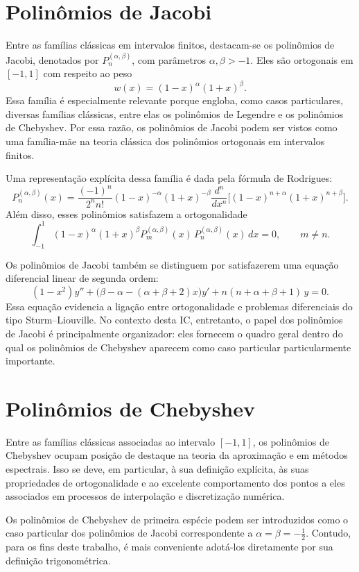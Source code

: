 \section{Polinômios de Jacobi}

Entre as famílias clássicas em intervalos finitos, destacam-se os polinômios de Jacobi, denotados por \(P_n^{(\alpha,\beta)}\), com parâmetros \(\alpha,\beta>-1\). Eles são ortogonais em \([-1,1]\) com respeito ao peso
\[
w(x)=(1-x)^\alpha(1+x)^\beta.
\]
Essa família é especialmente relevante porque engloba, como casos particulares, diversas famílias clássicas, entre elas os polinômios de Legendre e os polinômios de Chebyshev. Por essa razão, os polinômios de Jacobi podem ser vistos como uma família-mãe na teoria clássica dos polinômios ortogonais em intervalos finitos.

Uma representação explícita dessa família é dada pela fórmula de Rodrigues:
\[
P_n^{(\alpha,\beta)}(x)
=
\frac{(-1)^n}{2^n n!}(1-x)^{-\alpha}(1+x)^{-\beta}
\frac{d^n}{dx^n}\Big[(1-x)^{n+\alpha}(1+x)^{n+\beta}\Big].
\]
Além disso, esses polinômios satisfazem a ortogonalidade
\[
\int_{-1}^{1}(1-x)^\alpha(1+x)^\beta
P_m^{(\alpha,\beta)}(x)\,P_n^{(\alpha,\beta)}(x)\,dx=0,
\qquad m\neq n.
\]

Os polinômios de Jacobi também se distinguem por satisfazerem uma equação diferencial linear de segunda ordem:
\[
(1-x^2)y''+\big(\beta-\alpha-(\alpha+\beta+2)x\big)y'
+n(n+\alpha+\beta+1)\,y=0.
\]
Essa equação evidencia a ligação entre ortogonalidade e problemas diferenciais do tipo Sturm--Liouville. No contexto desta IC, entretanto, o papel dos polinômios de Jacobi é principalmente organizador: eles fornecem o quadro geral dentro do qual os polinômios de Chebyshev aparecem como caso particular particularmente importante.

\section{Polinômios de Chebyshev}

Entre as famílias clássicas associadas ao intervalo \([-1,1]\), os polinômios de Chebyshev ocupam posição de destaque na teoria da aproximação e em métodos espectrais. Isso se deve, em particular, à sua definição explícita, às suas propriedades de ortogonalidade e ao excelente comportamento dos pontos a eles associados em processos de interpolação e discretização numérica.

Os polinômios de Chebyshev de primeira espécie podem ser introduzidos como o caso particular dos polinômios de Jacobi correspondente a \(\alpha=\beta=-\tfrac12\). Contudo, para os fins deste trabalho, é mais conveniente adotá-los diretamente por sua definição trigonométrica.

